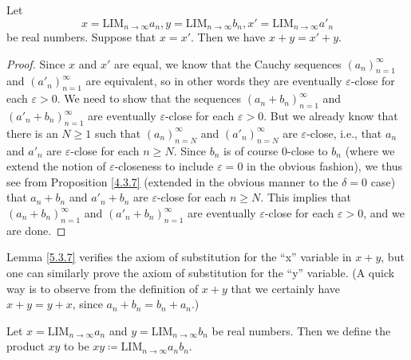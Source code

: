 \begin{lemma}\label{5.3.7}
    Let
    \[
        x = \text{LIM}_{n \to \infty} a_n, y = \text{LIM}_{n \to \infty} b_n, x' = \text{LIM}_{n \to \infty} a'_n
    \]
    be real numbers.
    Suppose that \(x = x'\).
    Then we have \(x + y = x' + y\).
\end{lemma}

\begin{proof}
    Since \(x\) and \(x'\) are equal, we know that the Cauchy sequences \((a_n)_{n = 1}^{\infty}\) and \((a'_n)_{n = 1}^{\infty}\) are equivalent, so in other words they are eventually \(\varepsilon\)-close for each \(\varepsilon > 0\).
    We need to show that the sequences \((a_n + b_n)_{n = 1}^{\infty}\) and \((a'_n + b_n)_{n = 1}^{\infty}\) are eventually \(\varepsilon\)-close for each \(\varepsilon > 0\).
    But we already know that there is an \(N \geq 1\) such that \((a_n)_{n = N}^{\infty}\) and \((a'_n)_{n = N}^{\infty}\) are \(\varepsilon\)-close, i.e., that \(a_n\) and \(a'_n\) are \(\varepsilon\)-close for each \(n \geq N\).
    Since \(b_n\) is of course \(0\)-close to \(b_n\) (where we extend the notion of \(\varepsilon\)-closeness to include \(\varepsilon = 0\) in the obvious fashion), we thus see from Proposition \ref{4.3.7} (extended in the obvious manner to the \(\delta = 0\) case) that \(a_n + b_n\) and \(a'_n + b_n\) are \(\varepsilon\)-close for each \(n \geq N\).
    This implies that \((a_n + b_n)_{n = 1}^{\infty}\) and \((a'_n + b_n)_{n = 1}^{\infty}\) are eventually \(\varepsilon\)-close for each \(\varepsilon > 0\), and we are done.
\end{proof}

\begin{remark}\label{5.3.8}
    Lemma \ref{5.3.7} verifies the axiom of substitution for the ``x'' variable in \(x + y\), but one can similarly prove the axiom of substitution for the ``y'' variable.
    (A quick way is to observe from the definition of \(x + y\) that we certainly have \(x + y = y + x\), since \(a_n + b_n = b_n + a_n\).)
\end{remark}

\begin{definition}\label{5.3.9}
    Let \(x = \text{LIM}_{n \to \infty} a_n\) and \(y = \text{LIM}_{n \to \infty} b_n\) be real numbers.
    Then we define the product \(xy\) to be \(xy \coloneqq \text{LIM}_{n \to \infty} a_n b_n\).
\end{definition}

